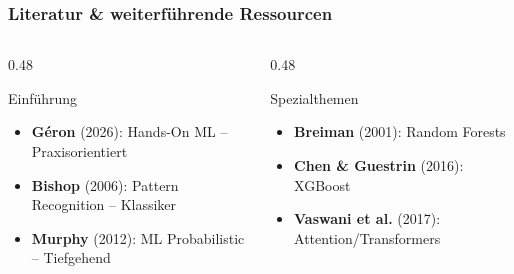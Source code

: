 \documentclass[11pt, aspectratio=169]{beamer}
\begin{document}
\begin{frame}[allowframebreaks]
    \frametitle{Literatur \& weiterführende Ressourcen}
    \begin{columns}[t]
        \begin{column}{0.48\textwidth}
            \begin{block}{Einführung}
                \begin{itemize}
                    \item \textbf{Géron} (2026): Hands-On ML -- Praxisorientiert
                    \item \textbf{Bishop} (2006): Pattern Recognition -- Klassiker
                    \item \textbf{Murphy} (2012): ML Probabilistic -- Tiefgehend
                \end{itemize}
            \end{block}
        \end{column}
        \begin{column}{0.48\textwidth}
            \begin{block}{Spezialthemen}
                \begin{itemize}
                    \item \textbf{Breiman} (2001): Random Forests
                    \item \textbf{Chen \& Guestrin} (2016): XGBoost
                    \item \textbf{Vaswani et al.} (2017): Attention/Transformers
                \end{itemize}
            \end{block}
        \end{column}
    \end{columns}
    \vspace{0.3cm}
    \printbibliography[heading=none]
\end{frame}
\end{document}
